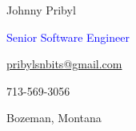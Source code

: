 \documentclass[11pt]{resume}
\begin{document}
    \noindent\begin{minipage}[t]{0.73\textwidth}
        \vspace{-5mm}
        {\par \Huge Johnny Pribyl}
        {\par \Large \textcolor{blue}{Senior Software Engineer}}
    \end{minipage}
    \begin{minipage}[t]{0.25\textwidth}
        \vspace{-5mm}
        \begin{flushright}
            {\par \textcolor{black}{\href{mailto:pribylsnbits@gmail.com}{pribylsnbits@gmail.com}}}
            {\par 713-569-3056}
            {\par Bozeman, Montana}
        \end{flushright}
    \end{minipage}
    \begin{minipage}[t]{0.03\textwidth}
        \vspace{-5mm}
        \begin{center}
            {\par \faEnvelope[regular]} 
            {\par \faMobile*} 
            {\par \faMapMarker*} 
        \end{center}
        \vspace{.01mm}
    \end{minipage}

    \noindent\begin{minipage}[t]{1\textwidth}
      \makebox[\linewidth]{\rule{\paperwidth}{0.2pt}}
    \end{minipage}
\end{document}
